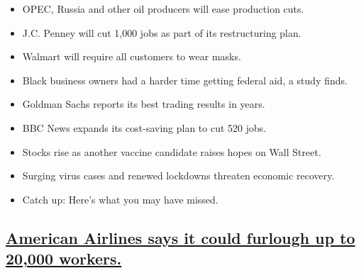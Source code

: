 \begin{itemize}
\item
  \protect\hyperlink{opec-russia-and-other-oil-producers-will-ease-production-cuts}{}

  OPEC, Russia and other oil producers will ease production cuts.
\item
  \protect\hyperlink{jc-penney-will-cut-1000-jobs-as-part-of-its-restructuring-plan}{}

  J.C. Penney will cut 1,000 jobs as part of its restructuring plan.
\item
  \protect\hyperlink{walmart-will-require-all-customers-to-wear-masks}{}

  Walmart will require all customers to wear masks.
\item
  \protect\hyperlink{black-business-owners-had-a-harder-time-getting-federal-aid-a-study-finds}{}

  Black business owners had a harder time getting federal aid, a study
  finds.
\item
  \protect\hyperlink{goldman-sachs-reports-its-best-trading-results-in-years}{}

  Goldman Sachs reports its best trading results in years.
\item
  \protect\hyperlink{bbc-news-expands-its-cost-saving-plan-to-cut-520-jobs}{}

  BBC News expands its cost-saving plan to cut 520 jobs.
\item
  \protect\hyperlink{stocks-rise-as-another-vaccine-candidate-raises-hopes-on-wall-street}{}

  Stocks rise as another vaccine candidate raises hopes on Wall Street.
\item
  \protect\hyperlink{surging-virus-cases-and-renewed-lockdowns-threaten-economic-recovery}{}

  Surging virus cases and renewed lockdowns threaten economic recovery.
\item
  \protect\hyperlink{catch-up-heres-what-you-may-have-missed}{}

  Catch up: Here's what you may have missed.
\end{itemize}

\hypertarget{american-airlines-says-it-could-furlough-up-to-20000-workers}{%
\subsection{\texorpdfstring{\protect\hyperlink{american-airlines-says-it-could-furlough-up-to-20000-workers}{American
Airlines says it could furlough up to 20,000
workers.}}{American Airlines says it could furlough up to 20,000 workers.}}\label{american-airlines-says-it-could-furlough-up-to-20000-workers}}

